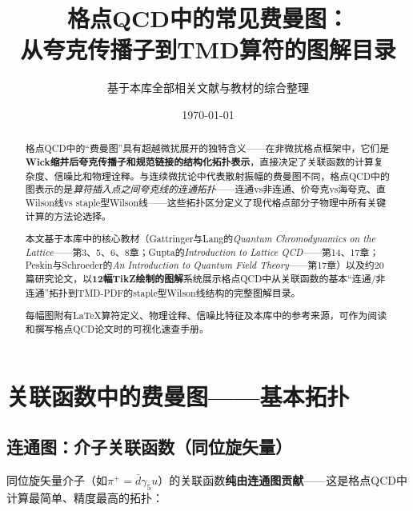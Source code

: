 \documentclass[12pt,a4paper]{ctexart}
\title{\heiti 格点QCD中的常见费曼图：\\
从夸克传播子到TMD算符的图解目录}
\author{基于本库全部相关文献与教材的综合整理}
\date{\today}
\begin{document}
\maketitle

\begin{abstract}
\noindent
格点QCD中的``费曼图''具有超越微扰展开的独特含义——在非微扰格点框架中，它们是\textbf{Wick缩并后夸克传播子和规范链接的结构化拓扑表示}，直接决定了关联函数的计算复杂度、信噪比和物理诠释。与连续微扰论中代表散射振幅的费曼图不同，格点QCD中的图表示的是\emph{算符插入点之间夸克线的连通拓扑}——连通vs非连通、价夸克vs海夸克、直Wilson线vs staple型Wilson线——这些拓扑区分定义了现代格点部分子物理中所有关键计算的方法论选择。

本文基于本库中的核心教材（Gattringer与Lang的\textit{Quantum Chromodynamics on the Lattice}——第3、5、6、8章；Gupta的\textit{Introduction to Lattice QCD}——第14、17章；Peskin与Schroeder的\textit{An Introduction to Quantum Field Theory}——第17章）以及约20篇研究论文，以\textbf{12幅TikZ绘制的图解}系统展示格点QCD中从关联函数的基本``连通/非连通''拓扑到TMD-PDF的staple型Wilson线结构的完整图解目录。

每幅图附有LaTeX算符定义、物理诠释、信噪比特征及本库中的参考来源，可作为阅读和撰写格点QCD论文时的可视化速查手册。
\end{abstract}

\tableofcontents
\newpage

\section{关联函数中的费曼图——基本拓扑}

\subsection{连通图：介子关联函数（同位旋矢量）}

同位旋矢量介子（如$\pi^+ = \bar d \gamma_5 u$）的关联函数\textbf{纯由连通图贡献}——这是格点QCD中计算最简单、精度最高的拓扑：
\end{document}
